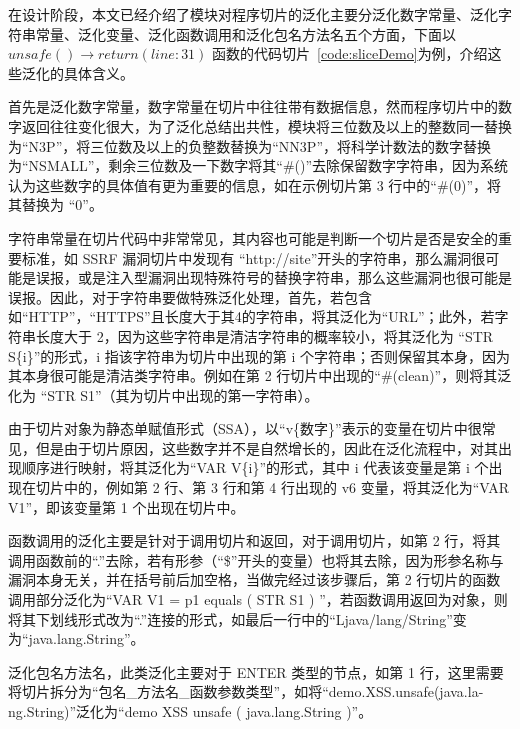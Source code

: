 在设计阶段，本文已经介绍了模块对程序切片的泛化主要分泛化数字常量、泛化字符串常量、泛化变量、泛化函数调用和泛化包名方法名五个方面，下面以 $unsafe() \rightarrow return(line:31)$ 函数的代码切片~\ref{code:sliceDemo}为例，介绍这些泛化的具体含义。

\begin{minipage}[!htbp]{0.9\textwidth}
    
\end{minipage}

首先是泛化数字常量，数字常量在切片中往往带有数据信息，然而程序切片中的数字返回往往变化很大，为了泛化总结出共性，模块将三位数及以上的整数同一替换为“N3P”，将三位数及以上的负整数替换为“NN3P”，将科学计数法的数字替换为“NSMALL”，剩余三位数及一下数字将其“\#()”去除保留数字字符串，因为系统认为这些数字的具体值有更为重要的信息，如在示例切片第 3 行中的“\#(0)”，将其替换为 “0”。

字符串常量在切片代码中非常常见，其内容也可能是判断一个切片是否是安全的重要标准，如 SSRF 漏洞切片中发现有 “http://site”开头的字符串，那么漏洞很可能是误报，或是注入型漏洞出现特殊符号的替换字符串，那么这些漏洞也很可能是误报。因此，对于字符串要做特殊泛化处理，首先，若包含如“HTTP”，“HTTPS”且长度大于其4的字符串，将其泛化为“URL”；此外，若字符串长度大于 2，因为这些字符串是清洁字符串的概率较小，将其泛化为 “STR S\{i\}”的形式，i 指该字符串为切片中出现的第 i 个字符串；否则保留其本身，因为其本身很可能是清洁类字符串。例如在第 2 行切片中出现的“\#(clean)”，则将其泛化为 “STR S1”（其为切片中出现的第一字符串）。

由于切片对象为静态单赋值形式（SSA），以“v\{数字\}”表示的变量在切片中很常见，但是由于切片原因，这些数字并不是自然增长的，因此在泛化流程中，对其出现顺序进行映射，将其泛化为“VAR V\{i\}”的形式，其中 i 代表该变量是第 i 个出现在切片中的，例如第 2 行、第 3 行和第 4 行出现的 v6 变量，将其泛化为“VAR V1”，即该变量第 1 个出现在切片中。

函数调用的泛化主要是针对于调用切片和返回，对于调用切片，如第 2 行，将其调用函数前的“.”去除，若有形参（“\$”开头的变量）也将其去除，因为形参名称与漏洞本身无关，并在括号前后加空格，当做完经过该步骤后，第 2 行切片的函数调用部分泛化为“VAR V1 = p1 equals ( STR S1 ) ”，若函数调用返回为对象，则将其下划线形式改为“.”连接的形式，如最后一行中的“Ljava/lang/String”变为“java.lang.String”。

泛化包名方法名，此类泛化主要对于 ENTER 类型的节点，如第 1 行，这里需要将切片拆分为“包名\_方法名\_函数参数类型”，如将“demo.XSS.unsafe(java.la-\\ng.String)”泛化为“demo XSS unsafe ( java.lang.String )”。\\

